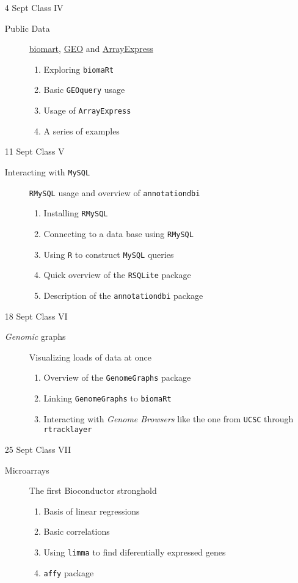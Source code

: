 \documentclass[letterpaper,12pt]{article}
\newcommand{\pl}[1]{\texttt{#1}}
\newcommand{\myurlshort}[2]{\href{http://#1}{{\textsf{#2}}}}
\begin{document}
\begin{itemize}
  \item[4 Sept] Class IV
  \begin{description}
  \item[Public Data] \myurlshort{biomart.org}{biomart}, \myurlshort{ncbi.nlm.nih.gov/geo/}{GEO} and \myurlshort{ebi.ac.uk/microarray-as/ae/}{ArrayExpress}
  \begin{enumerate}
  \item Exploring \pl{biomaRt}
  \item Basic \pl{GEOquery} usage
  \item Usage of \pl{ArrayExpress}
  \item A series of examples
  \end{enumerate}
  \end{description}
  
  \item[11 Sept] Class V
  \begin{description}
  \item[Interacting with \pl{MySQL}] \pl{RMySQL} usage and overview of \pl{annotationdbi}
  \begin{enumerate}
  \item Installing \pl{RMySQL}
  \item Connecting to a data base using \pl{RMySQL}
  \item Using \pl{R} to construct \pl{MySQL} queries
  \item Quick overview of the \pl{RSQLite} package
  \item Description of the \pl{annotationdbi} package
  \end{enumerate}
  \end{description}
  
  \item[18 Sept] Class VI
  \begin{description}
  \item[\emph{Genomic} graphs] Visualizing loads of data at once
  \begin{enumerate}
  \item Overview of the \pl{GenomeGraphs} package
  \item Linking \pl{GenomeGraphs} to \pl{biomaRt}
  \item Interacting with \emph{Genome Browsers} like the one from \pl{UCSC} through \pl{rtracklayer}
  \end{enumerate}
  \end{description}
  
  \item[25 Sept] Class VII
  \begin{description}
  \item[Microarrays] The first Bioconductor stronghold
  \begin{enumerate}
  \item Basis of linear regressions
  \item Basic correlations
  \item Using \pl{limma} to find diferentially expressed genes
  \item \pl{affy} package
  \end{enumerate}
  \end{description}
  

\end{itemize}
\end{document}
